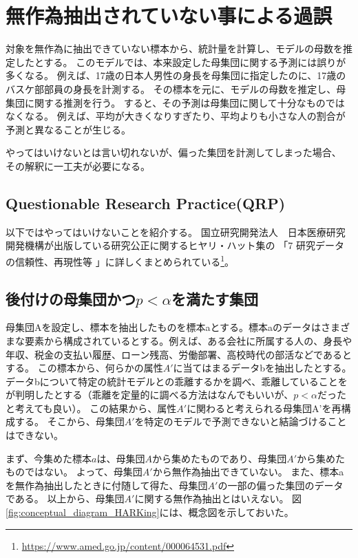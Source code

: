 \section{無作為抽出されていない事による過誤}
対象を無作為に抽出できていない標本から、統計量を計算し、モデルの母数を推定したとする。
このモデルでは、本来設定した母集団に関する予測には誤りが多くなる。
例えば、17歳の日本人男性の身長を母集団に指定したのに、17歳のバスケ部部員の身長を計測する。
その標本を元に、モデルの母数を推定し、母集団に関する推測を行う。
すると、その予測は母集団に関して十分なものではなくなる。
例えば、平均が大きくなりすぎたり、平均よりも小さな人の割合が予測と異なることが生じる。

やってはいけないとは言い切れないが、偏った集団を計測してしまった場合、
その解釈に一工夫が必要になる。


\subsection{Questionable Research Practice(QRP)}
以下ではやってはいけないことを紹介する。
国立研究開発法人　日本医療研究開発機構が出版している研究公正に関するヒヤリ・ハット集の
「7 研究データの信頼性、再現性等 」に詳しくまとめられている\footnote{\url{https://www.amed.go.jp/content/000064531.pdf}}。
\subsection{後付けの母集団かつ$p<\alpha$を満たす集団}
母集団Aを設定し、標本を抽出したものを標本aとする。標本aのデータはさまざまな要素から構成されているとする。例えば、ある会社に所属する人の、身長や年収、税金の支払い履歴、ローン残高、労働部署、高校時代の部活などであるとする。
この標本から、何らかの属性$A'$に当てはまるデータbを抽出したとする。
データbについて特定の統計モデルとの乖離するかを調べ、乖離していることをが判明したとする（乖離を定量的に調べる方法はなんでもいいが、$p<\alpha$だったと考えても良い）。
この結果から、属性$A'$に関わると考えられる母集団A'を再構成する。
そこから、母集団$A'$を特定のモデルで予測できないと結論づけることはできない。

まず、今集めた標本$a$は、母集団$A$から集めたものであり、母集団$A'$から集めたものではない。
よって、母集団$A'$から無作為抽出できていない。
また、標本aを無作為抽出したときに付随して得た、母集団$A'$の一部の偏った集団のデータである。
以上から、母集団$A'$に関する無作為抽出とはいえない。
図\ref{fig:conceptual_diagram_HARKing}には、概念図を示しておいた。

